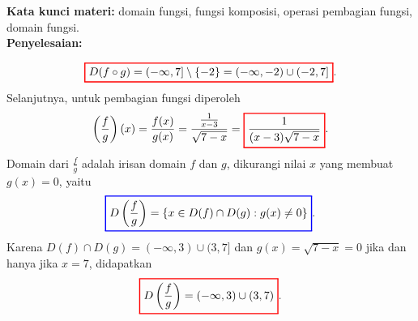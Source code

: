\documentclass[10pt,openany,a4paper]{article}
\theoremstyle{definition}
\theoremstyle{definition}
\theoremstyle{plain}
\newenvironment{jawab}[2][tes]{%
\par\noindent\textbf{Kata kunci materi:} #1.\\
\textbf{Penyelesaian:} #2%
}{}
\begin{document}
\begin{enumerate}
\begin{jawab}[domain fungsi, fungsi komposisi, operasi pembagian fungsi, domain fungsi]
{\begin{enumerate}
\begin{align*}
                \colorlet{oldcolor}{.}
        \color{red}
        \setlength{\fboxrule}{1pt} \boxed{\color{oldcolor}D(f\circ g) = (-\infty, 7] \setminus \{-2\} = (-\infty, -2) \cup (-2, 7]}\color{oldcolor}.
            \end{align*}
            Selanjutnya, untuk pembagian fungsi diperoleh
            \begin{align*}
                \left(\frac{f}{g}\right)(x) = \frac{f(x)}{g(x)} = \frac{\frac{1}{x-3}}{\sqrt{7-x}} = \colorlet{oldcolor}{.}
        \color{red}
        \setlength{\fboxrule}{1pt} \boxed{\color{oldcolor}\frac{1}{(x-3)\sqrt{7-x}}}\color{oldcolor}.
            \end{align*}
            Domain dari $\frac{f}{g}$ adalah irisan domain $f$ dan $g$, dikurangi nilai $x$ yang membuat $g(x)=0$, yaitu
            \begin{align*}
                \colorlet{oldcolor}{.}
        \color{blue}
        \setlength{\fboxrule}{1pt} \boxed{\color{oldcolor}D\left(\frac{f}{g}\right) = \{x \in D(f)\cap D(g) : g(x) \neq 0\}}\color{oldcolor}.
            \end{align*}
            Karena $D(f)\cap D(g) = (-\infty,3)\cup(3,7]$ dan $g(x)=\sqrt{7-x}=0$ jika dan hanya jika $x=7$, didapatkan
            \begin{align*}
                \colorlet{oldcolor}{.}
        \color{red}
        \setlength{\fboxrule}{1pt} \boxed{\color{oldcolor}D\left(\frac{f}{g}\right) = (-\infty, 3) \cup (3, 7)}\color{oldcolor}.
            \end{align*}
        \end{enumerate}
    }
    \end{jawab}


\end{enumerate}
\end{document}
